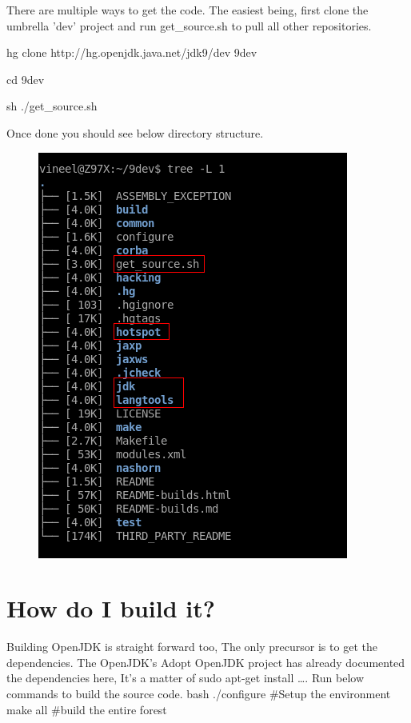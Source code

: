 \documentclass{article}
\begin{document}
There are multiple ways to get the code. The easiest being, first clone the umbrella 'dev' project and run get\_source.sh to pull all other repositories.

hg clone http://hg.openjdk.java.net/jdk9/dev 9dev

cd 9dev

sh ./get\_source.sh

Once done you should see below directory structure.

\begin{figure}[H]
\centering
\includegraphics[width=\textwidth]{OpenJDK-1.png}
\caption{}
\end{figure}

\section{How do I build it?}
Building OpenJDK is straight forward too, The only precursor is to get the dependencies. The OpenJDK’s Adopt OpenJDK project has already documented the dependencies here, It’s a matter of sudo apt-get install ….
Run below commands to build the source code. \newline
\newline
bash ./configure \#Setup the environment \newline
make all \#build the entire forest
\end{document}
